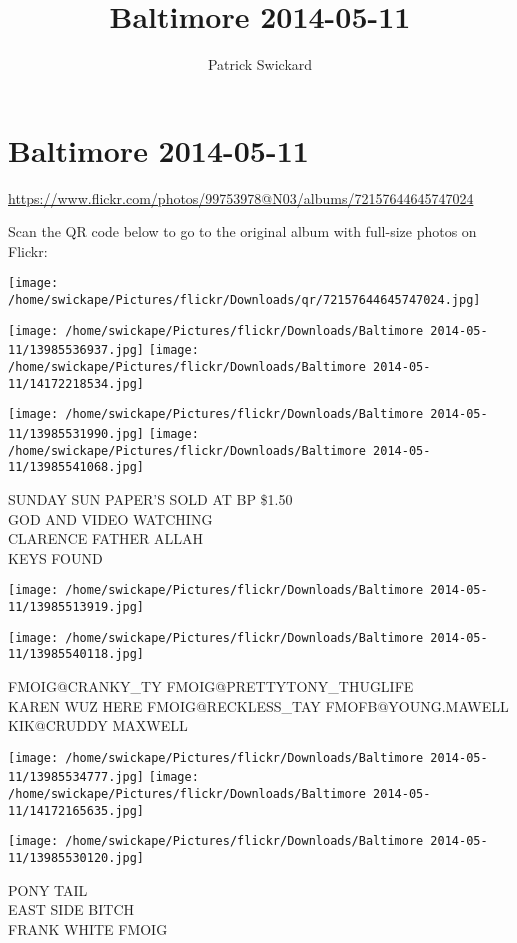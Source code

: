 \documentclass[10pt,letterpaper]{article}
\title{Baltimore 2014-05-11}
\author{Patrick Swickard}
\date{}
\begin{document}
\section*{Baltimore 2014-05-11}

\url{https://www.flickr.com/photos/99753978@N03/albums/72157644645747024}

Scan the QR code below to go to the original album with full-size photos on Flickr:

\texttt{[image: /home/swickape/Pictures/flickr/Downloads/qr/72157644645747024.jpg]}
\pagebreak

\texttt{[image: /home/swickape/Pictures/flickr/Downloads/Baltimore 2014-05-11/13985536937.jpg]}
\texttt{[image: /home/swickape/Pictures/flickr/Downloads/Baltimore 2014-05-11/14172218534.jpg]}

\texttt{[image: /home/swickape/Pictures/flickr/Downloads/Baltimore 2014-05-11/13985531990.jpg]}
\texttt{[image: /home/swickape/Pictures/flickr/Downloads/Baltimore 2014-05-11/13985541068.jpg]}

SUNDAY SUN PAPER'S SOLD AT BP \$1.50\\
GOD AND VIDEO WATCHING\\
CLARENCE FATHER ALLAH\\
KEYS FOUND
\pagebreak

\texttt{[image: /home/swickape/Pictures/flickr/Downloads/Baltimore 2014-05-11/13985513919.jpg]}

\vspace{0.25in}
\texttt{[image: /home/swickape/Pictures/flickr/Downloads/Baltimore 2014-05-11/13985540118.jpg]}

FMOIG@CRANKY\_TY FMOIG@PRETTYTONY\_THUGLIFE\\
KAREN WUZ HERE FMOIG@RECKLESS\_TAY FMOFB@YOUNG.MAWELL KIK@CRUDDY MAXWELL
\pagebreak

\texttt{[image: /home/swickape/Pictures/flickr/Downloads/Baltimore 2014-05-11/13985534777.jpg]}
\texttt{[image: /home/swickape/Pictures/flickr/Downloads/Baltimore 2014-05-11/14172165635.jpg]}

\vspace{0.25in}
\texttt{[image: /home/swickape/Pictures/flickr/Downloads/Baltimore 2014-05-11/13985530120.jpg]}

PONY TAIL\\
EAST SIDE BITCH\\
FRANK WHITE FMOIG
\pagebreak
\end{document}
